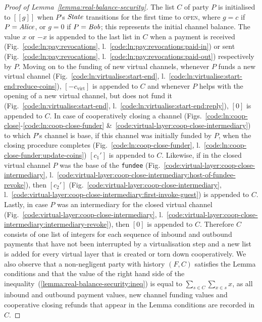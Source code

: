 \begin{proof}[Proof of Lemma~\ref{lemma:real-balance-security}]
  The list $C$ of party $P$ is initialised to $[[g]]$ when $P$'s $\itistate$
  transitions for the first time to \textsc{open}, where $g = c$ if $P =
  \mathit{Alice}$, or $g = 0$ if $P = \mathit{Bob}$; this represents the initial channel
  balance. The value $x$ or $-x$ is appended to the last list in $C$ when a
  payment is received (Fig.~\ref{code:ln:pay:revocations},
  l.~\ref{code:ln:pay:revocations:paid-in}) or sent
  (Fig.~\ref{code:ln:pay:revocations},
  l.~\ref{code:ln:pay:revocations:paid-out}) respectively by $P$. Moving on to
  the funding of new virtual channels, whenever $P$ funds a new virtual channel
  (Fig.~\ref{code:ln:virtualise:start-end},
  l.~\ref{code:ln:virtualise:start-end:reduce-coins}), $[-c_{\mathrm{virt}}]$
  is appended to $C$ and whenever $P$ helps with the opening of a new virtual
  channel, but does not fund it (Fig.~\ref{code:ln:virtualise:start-end},
  l.~\ref{code:ln:virtualise:start-end:reply}), $[0]$ is appended to $C$.
  In case of cooperatively closing a channel
  (Figs.~\ref{code:ln:coop-close}-\ref{code:ln:coop-close-funder}
  \&~\ref{code:virtual-layer:coop-close-intermediary}) to which $P$'s channel is
  base, if this channel was initially funded by $P$, when the closing procedure
  completes (Fig.~\ref{code:ln:coop-close-funder},
  l.~\ref{code:ln:coop-close-funder:update-coins}) $[c_1']$ is appended to $C$.
  Likewise, if in the closed virtual channel $P$ was the base of the
  \texttt{fundee} (Fig.~\ref{code:virtual-layer:coop-close-intermediary},
  l.~\ref{code:virtual-layer:coop-close-intermediary:host-of-fundee-revoke}),
  then $[c_2']$ (Fig.~\ref{code:virtual-layer:coop-close-intermediary},
  l.~\ref{code:virtual-layer:coop-close-intermediary:first-invoke-guest}) is
  appended to $C$. Lastly, in case $P$ was an intermediary for the closed
  virtual channel (Fig.~\ref{code:virtual-layer:coop-close-intermediary},
  l.~\ref{code:virtual-layer:coop-close-intermediary:intermediary-revoke}), then
  $[0]$ is appended to $C$. Therefore $C$ consists of one list of integers for
  each sequence of inbound and outbound payments that have not been interrupted
  by a virtualisation step and a new list is added for every virtual layer that
  is created or torn down cooperatively. We also observe that a non-negligent
  party with history $(F, C)$ satisfies the Lemma conditions and that the value
  of the right hand side of the
  inequality~(\ref{lemma:real-balance-security:ineq}) is equal to
  $\sum\limits_{s \in C} \sum\limits_{x \in s} x$, as all inbound and outbound
  payment values, new channel funding values and cooperative closing refunds
  that appear in the Lemma conditions are recorded in $C$.


\end{proof}
